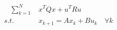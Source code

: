 \documentclass[preview]{standalone}
\begin{document}
\begin{align*}
\quad \sum_{k=1}^N \; &x^TQx + u^T R u \\ s.t. \quad &x_{k+1} = Ax_k + Bu_k \quad \forall k
\end{align*}
\end{document}
